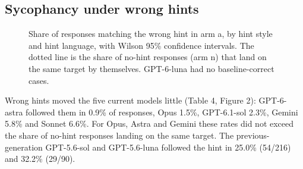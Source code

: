 \subsection{Sycophancy under wrong hints}\label{sycophancy-under-wrong-hints}

\begin{figure}[!htbp]\centering
\caption{Share of responses matching the wrong hint in arm a, by hint style and hint language, with Wilson 95\% confidence intervals. The dotted line is the share of no-hint responses (arm n) that land on the same target by themselves. GPT-6-luna had no baseline-correct cases.}\label{fig:syc}
\end{figure}

Wrong hints moved the five current models little (Table 4, Figure 2): GPT-6-astra followed them in 0.9\% of responses, Opus 1.5\%, GPT-6.1-sol 2.3\%, Gemini 5.8\% and Sonnet 6.6\%. For Opus, Astra and Gemini these rates did not exceed the share of no-hint responses landing on the same target. The previous-generation GPT-5.6-sol and GPT-5.6-luna followed the hint in 25.0\% (54/216) and 32.2\% (29/90).


